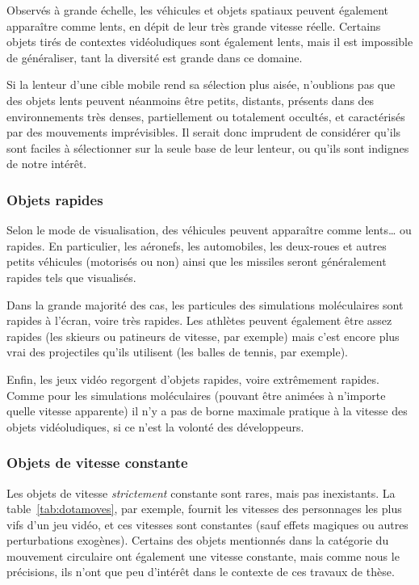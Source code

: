 	Observés à grande échelle, les véhicules et objets spatiaux peuvent également apparaître comme lents, en dépit de leur très grande vitesse réelle. Certains objets tirés de contextes vidéoludiques sont également lents, mais il est impossible de généraliser, tant la diversité est grande dans ce domaine.
	
	Si la lenteur d'une cible mobile rend sa sélection plus aisée, n'oublions pas que des objets lents peuvent néanmoins être petits, distants, présents dans des environnements très denses, partiellement ou totalement occultés, et caractérisés par des mouvements imprévisibles. Il serait donc imprudent de considérer qu'ils sont \og faciles \fg{} à sélectionner sur la seule base de leur lenteur, ou qu'ils sont indignes de notre intérêt.
	
	\subsubsection{Objets rapides}
	Selon le mode de visualisation, des véhicules peuvent apparaître comme lents\ldots{} ou rapides. En particulier, les aéronefs, les automobiles, les deux-roues et autres petits véhicules (motorisés ou non) ainsi que les missiles seront généralement rapides tels que visualisés.
	
	Dans la grande majorité des cas, les particules des simulations moléculaires sont rapides à l'écran, voire très rapides. Les athlètes peuvent également être assez rapides (les skieurs ou patineurs de vitesse, par exemple) mais c'est encore plus vrai des projectiles qu'ils utilisent (les balles de tennis, par exemple).
	
	Enfin, les jeux vidéo regorgent d'objets rapides, voire extrêmement rapides. Comme pour les simulations moléculaires (pouvant être animées à n'importe quelle vitesse apparente) il n'y a pas de borne maximale pratique à la vitesse des objets vidéoludiques, si ce n'est la volonté des développeurs.
	
	\subsubsection{Objets de vitesse constante}
	Les objets de vitesse \emph{strictement} constante sont rares, mais pas inexistants. La table~\ref{tab:dotamoves}, par exemple, fournit les vitesses des personnages les plus vifs d'un jeu vidéo, et ces vitesses sont constantes (sauf effets magiques ou autres perturbations exogènes). Certains des objets mentionnés dans la catégorie du mouvement circulaire ont également une vitesse constante, mais comme nous le précisions, ils n'ont que peu d'intérêt dans le contexte de ces travaux de thèse.
	
